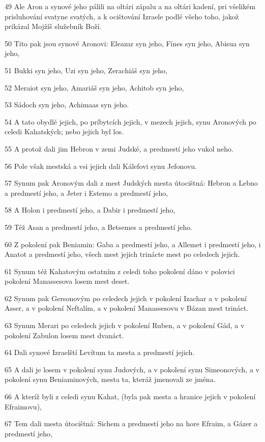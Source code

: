 \par 49 Ale Aron a synové jeho pálili na oltári zápalu a na oltári kadení, pri všelikém prisluhování svatyne svatých, a k ocištování Izraele podlé všeho toho, jakož prikázal Mojžíš služebník Boží.
\par 50 Tito pak jsou synové Aronovi: Eleazar syn jeho, Fínes syn jeho, Abisua syn jeho,
\par 51 Bukki syn jeho, Uzi syn jeho, Zerachiáš syn jeho,
\par 52 Meraiot syn jeho, Amariáš syn jeho, Achitob syn jeho,
\par 53 Sádoch syn jeho, Achimaas syn jeho.
\par 54 A tato obydlé jejich, po príbytcích jejich, v mezech jejich, synu Aronových po celedi Kahatských; nebo jejich byl los.
\par 55 A protož dali jim Hebron v zemi Judské, a predmestí jeho vukol neho.
\par 56 Pole však mestská a vsi jejich dali Kálefovi synu Jefonovu.
\par 57 Synum pak Aronovým dali z mest Judských mesta útocištná: Hebron a Lebno a predmestí jeho, a Jeter i Estemo a predmestí jeho,
\par 58 A Holon i predmestí jeho, a Dabir i predmestí jeho,
\par 59 Též Asan a predmestí jeho, a Betsemes a predmestí jeho.
\par 60 Z pokolení pak Beniamin: Gaba a predmestí jeho, a Allemet i predmestí jeho, i Anatot a predmestí jeho, všech mest jejich trinácte mest po celedech jejich.
\par 61 Synum též Kahatovým ostatním z celedi toho pokolení dáno v polovici pokolení Manassesova losem mest deset.
\par 62 Synum pak Gersonovým po celedech jejich v pokolení Izachar a v pokolení Asser, a v pokolení Neftalím, a v pokolení Manassesovu v Bázan mest trináct.
\par 63 Synum Merari po celedech jejich v pokolení Ruben, a v pokolení Gád, a v pokolení Zabulon losem mest dvanáct.
\par 64 Dali synové Izraelští Levítum ta mesta a predmestí jejich.
\par 65 A dali je losem v pokolení synu Judových, a v pokolení synu Simeonových, a v pokolení synu Beniaminových, mesta ta, kteráž jmenovali ze jména.
\par 66 A kteríž byli z celedi synu Kahat, (byla pak mesta a hranice jejich v pokolení Efraimovu),
\par 67 Tem dali mesta útocištná: Sichem a predmestí jeho na hore Efraim, a Gázer a predmestí jeho,
